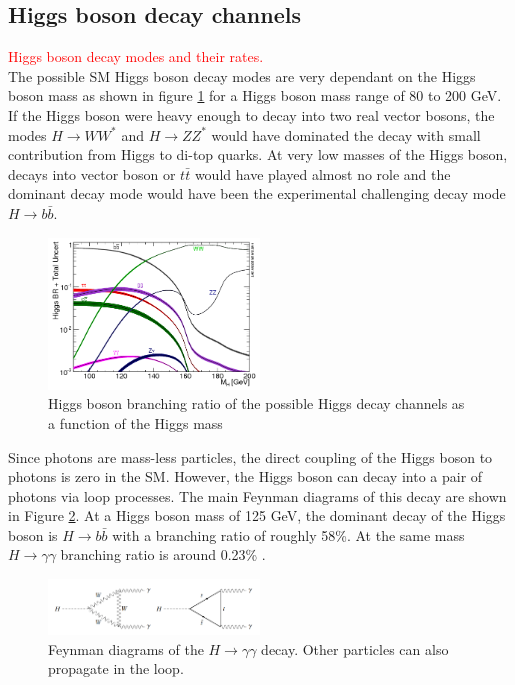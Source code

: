 \subsection{Higgs boson decay channels}
\label{chap1:EWSB:HD}
\textcolor{red}{Higgs boson decay modes and their rates. \\}
The possible SM Higgs boson decay modes are very dependant on the Higgs boson mass as shown in figure \ref{fig:chap1:EWSB:BR} for a Higgs boson mass range of 80 to 200 GeV. If the Higgs boson were heavy enough to decay into two real vector bosons, the modes $H\rightarrow WW^*$ and $ H\rightarrow ZZ^*$ would have dominated the decay with small contribution from Higgs to di-top quarks. At very low masses of the Higgs boson, decays into vector boson or $t\bar{t}$ would have played almost no role and the dominant decay mode would have been the experimental challenging decay mode $H\rightarrow b\bar{b}$.
\begin{figure}[h!]
    \centering
    \includegraphics[width=0.5\textwidth]{Ch1/Img/Higgs_Br.png}
    \caption{Higgs boson branching ratio of the possible Higgs decay channels as a function of the Higgs mass \cite{HiggsBR}}
    \label{fig:chap1:EWSB:BR}
\end{figure}
Since photons are mass-less particles, the direct coupling of the Higgs boson to photons is zero in the SM. However, the Higgs boson can decay into a pair of photons via loop processes. The main Feynman diagrams of this decay are shown in Figure \ref{fig:chap1:EWSB:Hgg}. 
At a Higgs boson mass of 125 GeV, the dominant decay of the Higgs boson is $H \rightarrow b\bar{b}$ with a branching ratio of roughly 58\%. At the same mass $H\rightarrow\gamma\gamma$ branching ratio is around 0.23\% \cite{HXSWG}.
\begin{figure}[htbp]
    \centering
    \includegraphics[width=0.5\textwidth]{Ch1/Img/H_to_gammagamma.png}
    \caption{Feynman diagrams of the $H\rightarrow\gamma\gamma$ decay. Other particles can also propagate in the loop.}
    \label{fig:chap1:EWSB:Hgg}
\end{figure}

